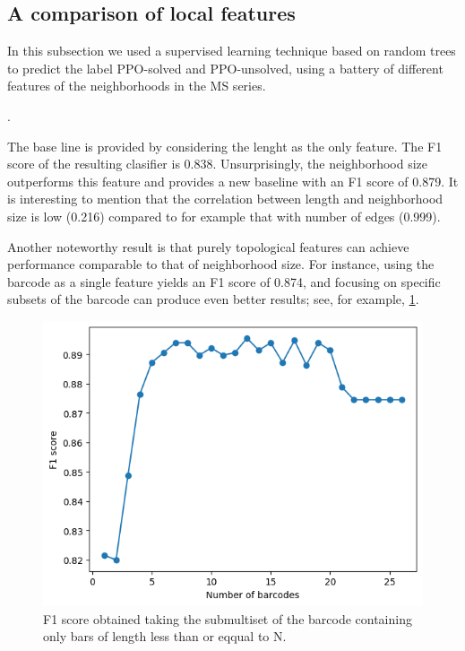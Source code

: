 \subsection{A comparison of local features}

In this subsection we used a supervised learning technique based on random trees to predict the label PPO-solved and PPO-unsolved, using a battery of different features of the neighborhoods in the MS series. 

. 

The base line is provided by considering the lenght as the only feature.
The F1 score of the resulting clasifier is 0.838.
Unsurprisingly, the neighborhood size outperforms this feature and provides a new baseline with an F1 score of 0.879.
It is interesting to mention that the correlation between length and neighborhood size is low (0.216) compared to for example that with number of edges (0.999).

Another noteworthy result is that purely topological features can achieve performance comparable to that of neighborhood size.  
For instance, using the barcode as a single feature yields an F1 score of 0.874, and focusing on specific subsets of the barcode can produce even better results; see, for example, \cref{fig:barcode_f1_scores}.

\begin{figure}
	\includegraphics[scale=.6]{fig/barcode_f1_scores.png}
	\caption{F1 score obtained taking the submultiset of the barcode containing only bars of length less than or eqqual to N.}
	\label{fig:barcode_f1_scores}
\end{figure}

